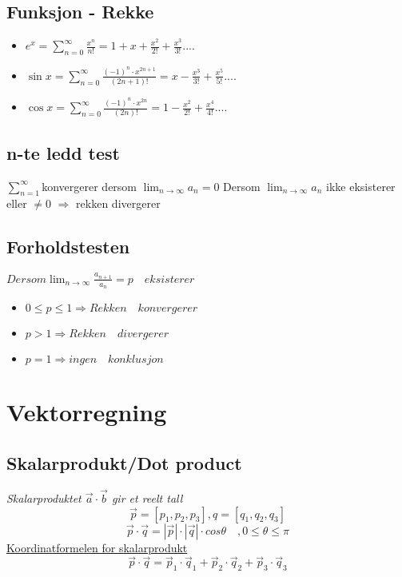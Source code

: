 \documentclass[12pt]{article}
\begin{document}
\subsection*{Funksjon - Rekke}
\begin{itemize}
\item$e^x =\sum^{\infty}_{n=0}\frac{x^n}{n!} = 1+x+\frac{x^2}{2!}+\frac{x^3}{3!}....$
\item$\sin x =\sum^{\infty}_{n=0}\frac{(-1)^n\cdot x^{2n+1}}{(2n + 1)!} = x - \frac{x^3}{3!} + \frac{x^5}{5!}....$ 
\item$\cos x =\sum^{\infty}_{n=0}\frac{(-1)^n\cdot x^{2n}}{(2n)!} = 1 - \frac{x^2}{2!} + \frac{x^4}{4!}....$
\end{itemize}
\subsection*{n-te ledd test}
$\sum^{\infty}_{n=1}$konvergerer dersom $\lim_{n\to\infty}a_n=0$
\newline Dersom $\lim_{n\to\infty}a_n$ ikke eksisterer eller $\neq 0$
\newline$\Rightarrow$ rekken divergerer
\subsection*{Forholdstesten}
\underline{$Dersom \lim_{n\to\infty} \frac{a_{n+1}}{a_n} = p \quad eksisterer$}
\begin{itemize}
\item $0\leq p \leq 1 \Rightarrow Rekken \quad konvergerer$
\item $p > 1 \Rightarrow Rekken \quad divergerer$
\item $p = 1 \Rightarrow ingen \quad konklusjon$
\end{itemize}


\newpage\section{Vektorregning}
\subsection*{Skalarprodukt/Dot product}
{\em Skalarproduktet $\vec a \cdot \vec b$ gir et reelt tall}
\[\vec p = [p_1,p_2,p_3], q = [q_1,q_2,q_3]\]
\[\vec p \cdot \vec q = |\vec p| \cdot |\vec q| \cdot cos \theta \quad, 0 \leq \theta \leq \pi\]
\underline{Koordinatformelen for skalarprodukt}
\[\vec p \cdot \vec q = \vec p_1 \cdot \vec q_1 + \vec p_2 \cdot \vec q_2 + \vec p_3 \cdot \vec q_3\]
\end{document}
